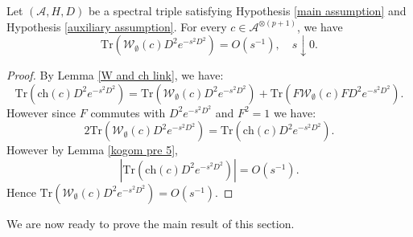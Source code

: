     \begin{lem}\label{kogom5}
        Let $(\mathcal{A},H,D)$ be a spectral triple satisfying Hypothesis \ref{main assumption} and Hypothesis \ref{auxiliary assumption}. For every $c \in \mathcal{A}^{\otimes(p+1)}$, we have
        \begin{equation*}
            \mathrm{Tr}(\mathcal{W}_{\emptyset}(c)D^2e^{-s^2D^2}) = O(s^{-1}),\quad s\downarrow 0.
        \end{equation*}
    \end{lem}
    \begin{proof} 
        By Lemma \ref{W and ch link}, we have:
        \begin{equation*}
            \mathrm{Tr}(\mathrm{ch}(c)D^2e^{-s^2D^2}) = \mathrm{Tr}(\mathcal{W}_{\emptyset}(c)D^2e^{-s^2D^2})+\mathrm{Tr}(F\mathcal{W}_{\emptyset}(c)FD^2e^{-s^2D^2}).
        \end{equation*}
        However since $F$ commutes with $D^2e^{-s^2D^2}$ and $F^2=1$ we have:
        \begin{equation*}
            2\mathrm{Tr}(\mathcal{W}_{\emptyset}(c)D^2e^{-s^2D^2}) = \mathrm{Tr}(\mathrm{ch}(c)D^2e^{-s^2D^2}).
        \end{equation*}
        However by Lemma \ref{kogom pre 5},
        \begin{equation*}
            |\mathrm{Tr}(\mathrm{ch}(c)D^2e^{-s^2D^2})| = O(s^{-1}).
        \end{equation*}
        Hence $\mathrm{Tr}(\mathcal{W}_{\emptyset}(c)D^2e^{-s^2D^2}) = O(s^{-1})$.
    \end{proof}

    We are now ready to prove the main result of this section.

